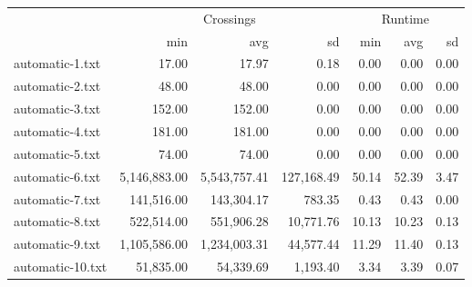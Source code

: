 \begin{tabular}{l|rrr|rrr|}
  \toprule   & \multicolumn{3}{c}{Crossings} & \multicolumn{3}{c}{Runtime} \\ & min & avg & sd & min & avg & sd \\ 
  \midrule automatic-1.txt & 17.00 & 17.97 & 0.18 & 0.00 & 0.00 & 0.00 \\ 
  automatic-2.txt & 48.00 & 48.00 & 0.00 & 0.00 & 0.00 & 0.00 \\ 
  automatic-3.txt & 152.00 & 152.00 & 0.00 & 0.00 & 0.00 & 0.00 \\ 
  automatic-4.txt & 181.00 & 181.00 & 0.00 & 0.00 & 0.00 & 0.00 \\ 
  automatic-5.txt & 74.00 & 74.00 & 0.00 & 0.00 & 0.00 & 0.00 \\ 
  automatic-6.txt & 5,146,883.00 & 5,543,757.41 & 127,168.49 & 50.14 & 52.39 & 3.47 \\ 
  automatic-7.txt & 141,516.00 & 143,304.17 & 783.35 & 0.43 & 0.43 & 0.00 \\ 
  automatic-8.txt & 522,514.00 & 551,906.28 & 10,771.76 & 10.13 & 10.23 & 0.13 \\ 
  automatic-9.txt & 1,105,586.00 & 1,234,003.31 & 44,577.44 & 11.29 & 11.40 & 0.13 \\ 
  automatic-10.txt & 51,835.00 & 54,339.69 & 1,193.40 & 3.34 & 3.39 & 0.07 \\ 
   \bottomrule \end{tabular}
